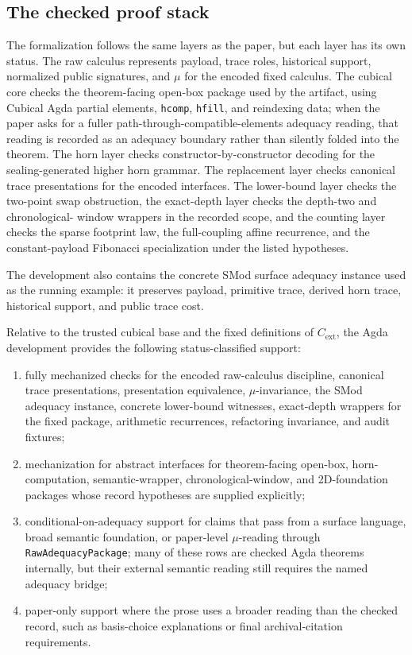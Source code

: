 \documentclass{lmcs}
\begin{document}
\subsection{The checked proof stack}
\label{subsec:mechanization-checked-stack}

The formalization follows the same layers as the paper, but each layer has its own status.  The
raw calculus represents payload, trace roles, historical support, normalized public signatures,
and \(\mu\) for the encoded fixed calculus.  The cubical core checks the theorem-facing
open-box package used by the artifact, using Cubical Agda partial elements, \texttt{hcomp},
\texttt{hfill}, and reindexing data; when the paper asks for a fuller
path-through-compatible-elements adequacy reading, that reading is recorded as an adequacy
boundary rather than silently folded into the theorem.  The horn layer checks
constructor-by-constructor decoding for the sealing-generated higher horn grammar.  The replacement layer
checks canonical trace presentations for the encoded interfaces.  The lower-bound layer checks
the two-point swap obstruction, the exact-depth layer checks the depth-two and chronological-
window wrappers in the recorded scope, and the counting layer checks the sparse footprint law,
the full-coupling affine recurrence, and the constant-payload Fibonacci specialization under
the listed hypotheses.

The development also contains the concrete SMod surface adequacy instance used as the running
example: it preserves payload, primitive trace, derived horn trace, historical support, and
public trace cost.

\begin{thm}
\label{thm:mechanized-theorem-stack}
Relative to the trusted cubical base and the fixed definitions of \(C_{\mathrm{ext}}\), the
Agda development provides the following status-classified support:
\begin{enumerate}
\item fully mechanized checks for the encoded raw-calculus discipline, canonical trace
presentations, presentation equivalence, \(\mu\)-invariance, the SMod adequacy instance,
concrete lower-bound witnesses, exact-depth wrappers for the fixed package, arithmetic
recurrences, refactoring invariance, and audit fixtures;
\item mechanization for abstract interfaces for theorem-facing open-box, horn-computation,
semantic-wrapper, chronological-window, and 2D-foundation packages whose record
hypotheses are supplied explicitly;
\item conditional-on-adequacy support for claims that pass from a surface language, broad
semantic foundation, or paper-level \(\mu\)-reading through \texttt{RawAdequacyPackage}; many
of these rows are checked Agda theorems internally, but their external semantic reading still
requires the named adequacy bridge;
\item paper-only support where the prose uses a broader reading than the checked record, such
as basis-choice explanations or final archival-citation requirements.
\end{enumerate}
\end{thm}
\end{document}
